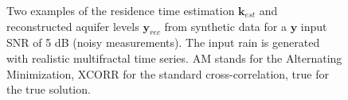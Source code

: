 \documentclass[]{elsarticle} %
\begin{document}
\begin{figure}[H]
    \centering
    \caption{Two examples of the residence time estimation $\textbf{k}_{est}$ and reconstructed aquifer levels $\textbf{y}_{rec}$ from synthetic data for a $\textbf{y}$ input SNR of 5 dB (noisy measurements). The input rain is generated with realistic multifractal time series. AM stands for the Alternating Minimization, XCORR for the standard cross-correlation, true for the true solution.}
    \label{fig_synthetic_1}
\end{figure}
\end{document}
